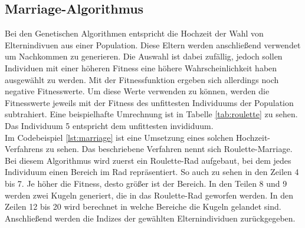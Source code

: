 \subsection{Marriage-Algorithmus}
Bei den Genetischen Algorithmen entspricht die Hochzeit der Wahl von Elternindivuen aus einer Population. Diese Eltern werden anschließend verwendet um Nachkommen zu generieren. 
Die Auswahl ist dabei zufällig, jedoch sollen Individuen mit einer höheren Fitness eine höhere Wahrscheinlichkeit haben ausgewählt zu werden. 
Mit der Fitnessfunktion ergeben sich allerdings noch negative Fitnesswerte. Um diese Werte verwenden zu können, werden die Fitnesswerte jeweils mit der Fitness des unfittesten Individuums der Population subtrahiert. Eine beispielhafte Umrechnung ist in Tabelle \ref{tab:roulette} zu sehen. Das Individuum 5 entspricht dem unfittesten invididuum. \\
Im Codebeispiel \ref{lst:marriage} ist eine Umsetzung eines solchen Hochzeit-Verfahrens zu sehen. Das beschriebene Verfahren nennt sich Roulette-Marriage. Bei diesem Algorithmus wird zuerst ein Roulette-Rad aufgebaut, bei dem jedes Individuum einen Bereich im Rad repräsentiert.
So auch zu sehen in den Zeilen 4 bis 7. Je höher die Fitness, desto größer ist der Bereich. In den Teilen 8 und 9 werden zwei Kugeln generiert, die in das Roulette-Rad geworfen werden. In den Zeilen 12 bis 20 wird berechnet in welche Bereiche die Kugeln gelandet sind. Anschließend werden die Indizes der 
gewählten Elternindividuen zurückgegeben.

